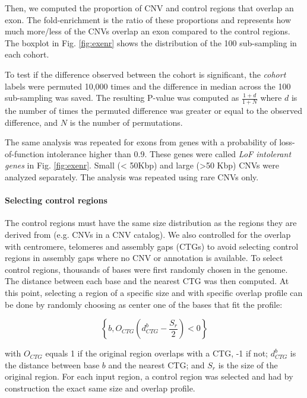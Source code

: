 Then, we computed the proportion of CNV and control regions that overlap an exon.
The fold-enrichment is the ratio of these proportions and represents how much more/less of the CNVs overlap an exon compared to the control regions.
The boxplot in Fig. \ref{fig:exenr} shows the distribution of the 100 sub-sampling in each cohort.


To test if the difference observed between the cohort is significant, the {\it cohort} labels were permuted 10,000 times and the difference in median across the 100 sub-sampling was saved.
The resulting P-value was computed as $\frac{1+d}{1+N}$ where $d$ is the number of times the permuted difference was greater or equal to the observed difference, and $N$ is the number of permutations.

The same analysis was repeated for exons from genes with a probability of loss-of-function intolerance\citep{Lek2016} higher than 0.9.
These genes were called {\it LoF intolerant genes} in Fig. \ref{fig:exenr}.
Small (< 50Kbp) and large (>50 Kbp) CNVs were analyzed separately.
The analysis was repeated using rare CNVs only.


\paragraph{Selecting control regions}
The control regions must have the same size distribution as the regions they are derived from (e.g. CNVs in a CNV catalog).
We also controlled for the overlap with centromere, telomeres and assembly gaps (CTGs) to avoid selecting control regions in assembly gaps where no CNV or annotation is available.
To select control regions, thousands of bases were first randomly chosen in the genome.
The distance between each base and the nearest CTG was then computed.
At this point, selecting a region of a specific size and with specific overlap profile can be done by randomly choosing as center one of the bases that fit the profile:

\begin{equation}
  \left\{b,  O_{CTG}(d_{CTG}^b - \frac{S_r}{2}) < 0\right\}  
\end{equation}

\noindent with $O_{CTG}$ equals 1 if the original region overlaps with a CTG, -1 if not; $d_{CTG}^b$ is the distance between base $b$ and the nearest CTG; and $S_r$ is the size of the original region.
For each input region, a control region was selected and had by construction the exact same size and overlap profile.


